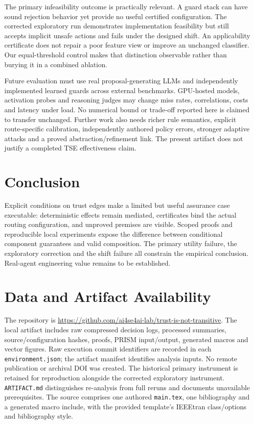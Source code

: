 \documentclass[lettersize,journal]{IEEEtran}
\begin{document}
The primary infeasibility outcome is practically relevant. A guard stack can
have sound rejection behavior yet provide no useful certified configuration.
The corrected exploratory run demonstrates implementation feasibility but
still accepts implicit unsafe actions and fails under the designed shift.
An applicability certificate does not repair a poor feature view or improve
an unchanged classifier. Our equal-threshold control makes that distinction
observable rather than burying it in a combined ablation.

Future evaluation must use real proposal-generating LLMs and independently
implemented learned guards across external benchmarks. GPU-hosted models,
activation probes and reasoning judges may change miss rates, correlations,
costs and latency under load. No numerical bound or trade-off reported here
is claimed to transfer unchanged. Further work also needs richer rule
semantics, explicit route-specific calibration, independently authored policy
errors, stronger adaptive attacks and a proved abstraction/refinement link.
The present artifact does not justify a completed TSE effectiveness claim.

\section{Conclusion}
Explicit conditions on trust edges make a limited but useful assurance case
executable: deterministic effects remain mediated, certificates bind the
actual routing configuration, and unproved premises are visible. Scoped
proofs and reproducible local experiments expose the difference between
conditional component guarantees and valid composition. The primary utility
failure, the exploratory correction and the shift failure all constrain the
empirical conclusion. Real-agent engineering value remains to be established.

\section*{Data and Artifact Availability}
The repository is \url{https://github.com/ai4se4ai-lab/trust-is-not-transitive}.
The local artifact includes raw compressed decision logs, processed summaries,
source/configuration hashes, proofs, PRISM input/output, generated macros and
vector figures. Raw execution commit identifiers are recorded in each
\texttt{environment.json}; the artifact manifest identifies analysis inputs.
No remote publication or archival DOI was created. The historical primary
instrument is retained for reproduction alongside the corrected exploratory
instrument. \texttt{ARTIFACT.md} distinguishes re-analysis from full reruns and
documents unavailable prerequisites. The source comprises one authored
\texttt{main.tex}, one bibliography and a generated macro include, with the
provided template's IEEEtran class/options and bibliography style.
\end{document}
